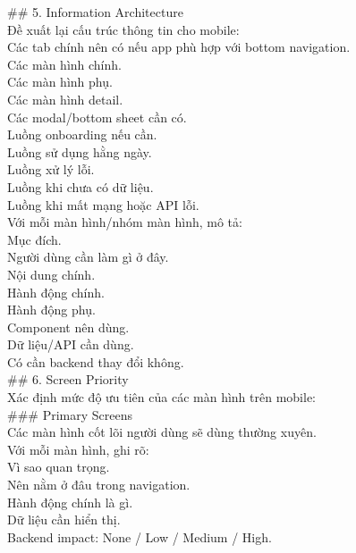 \begin{enumerate}
\#\# 5. Information Architecture \\

Đề xuất lại cấu trúc thông tin cho mobile: \\
\* Các tab chính nên có nếu app phù hợp với bottom navigation. \\
\* Các màn hình chính. \\
\* Các màn hình phụ. \\
\* Các màn hình detail. \\
\* Các modal/bottom sheet cần có. \\
\* Luồng onboarding nếu cần. \\
\* Luồng sử dụng hằng ngày. \\
\* Luồng xử lý lỗi. \\
\* Luồng khi chưa có dữ liệu. \\
\* Luồng khi mất mạng hoặc API lỗi. \\


Với mỗi màn hình/nhóm màn hình, mô tả: \\
\* Mục đích. \\
\* Người dùng cần làm gì ở đây. \\
\* Nội dung chính. \\
\* Hành động chính. \\
\* Hành động phụ. \\
\* Component nên dùng. \\
\* Dữ liệu/API cần dùng. \\
\* Có cần backend thay đổi không. \\


\#\# 6. Screen Priority \\

Xác định mức độ ưu tiên của các màn hình trên mobile: \\

\#\#\# Primary Screens \\

Các màn hình cốt lõi người dùng sẽ dùng thường xuyên. \\

Với mỗi màn hình, ghi rõ: \\
\* Vì sao quan trọng. \\
\* Nên nằm ở đâu trong navigation. \\
\* Hành động chính là gì. \\
\* Dữ liệu cần hiển thị. \\
\* Backend impact: None / Low / Medium / High. \\



\end{enumerate}
